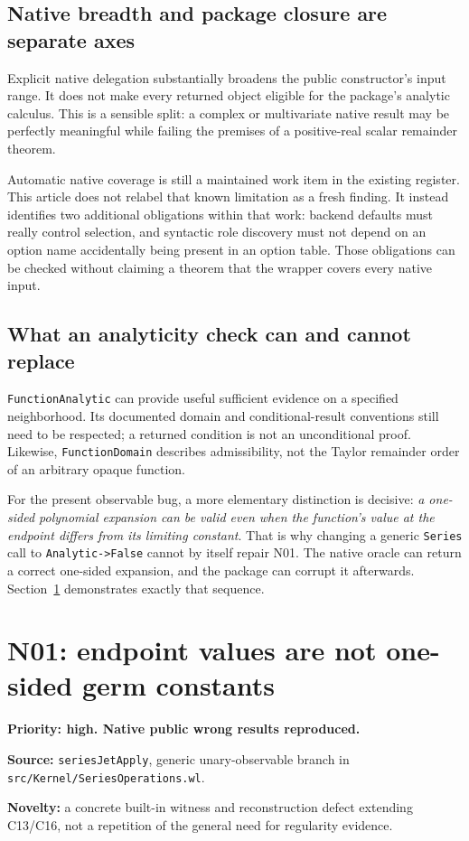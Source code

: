\documentclass[11pt,letterpaper]{article}
\newcommand{\code}[1]{\nolinkurl{#1}}
\begin{document}
\subsection{Native breadth and package closure are separate axes}
Explicit native delegation substantially broadens the public constructor's
input range. It does not make every returned object eligible for the package's
analytic calculus. This is a sensible split: a complex or multivariate native
result may be perfectly meaningful while failing the premises of a positive-real
scalar remainder theorem.~\cite{compatibility,nativecontracts}

Automatic native coverage is still a maintained work item in the existing
register. This article does not relabel that known limitation as a fresh
finding. It instead identifies two additional obligations within that work:
backend defaults must really control selection, and syntactic role discovery
must not depend on an option name accidentally being present in an option
table. Those obligations can be checked without claiming a theorem that the
wrapper covers every native input.~\cite{register,compatibility}

\subsection{What an analyticity check can and cannot replace}
\code{FunctionAnalytic} can provide useful sufficient evidence on a specified
neighborhood. Its documented domain and conditional-result conventions still
need to be respected; a returned condition is not an unconditional proof.
Likewise, \code{FunctionDomain} describes admissibility, not the Taylor remainder
order of an arbitrary opaque function.~\cite{wl-analytic,wl-domain}

For the present observable bug, a more elementary distinction is decisive:
\emph{a one-sided polynomial expansion can be valid even when the function's
value at the endpoint differs from its limiting constant}. That is why changing
a generic \code{Series} call to \code{Analytic->False} cannot by itself repair
N01. The native oracle can return a correct one-sided expansion, and the
package can corrupt it afterwards. Section~\ref{sec:n01} demonstrates exactly
that sequence.

\section{N01: endpoint values are not one-sided germ constants}\label{sec:n01}
\begin{findingbox}
\textbf{Priority: high. Native public wrong results reproduced.}\par
\textbf{Source:} \code{seriesJetApply}, generic unary-observable branch in
\code{src/Kernel/SeriesOperations.wl}.\par
\textbf{Novelty:} a concrete built-in witness and reconstruction defect extending
C13/C16, not a repetition of the general need for regularity evidence.
\end{findingbox}
\end{document}

